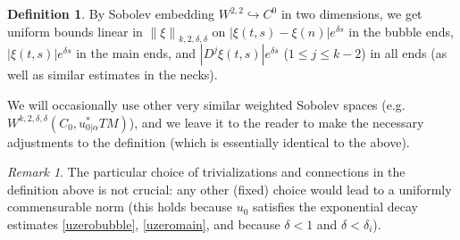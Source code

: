 \documentclass[12pt]{article}
\theoremstyle{definition}
\newtheorem{definition}[theorem]{Definition}
\theoremstyle{remark}
\newtheorem{remark}[theorem]{Remark}
\numberwithin{equation}{subsection}
\begin{document}
\begin{definition}
By Sobolev embedding $W^{2,2}\hookrightarrow C^0$ in two dimensions, we get uniform bounds linear in $\left\|\xi\right\|_{k,2,\delta,\delta}$ on $\left|\xi(t,s)-\xi(n)\right|e^{\delta s}$ in the bubble ends, $\left|\xi(t,s)\right|e^{\delta s}$ in the main ends, and $\left|D^j\xi(t,s)\right|e^{\delta s}$ ($1\leq j\leq k-2$) in all ends (as well as similar estimates in the necks).

We will occasionally use other very similar weighted Sobolev spaces (e.g.\ $W^{k,2,\delta,\delta}(C_0,u_{0|\alpha}^\ast TM)$), and we leave it to the reader to make the necessary adjustments to the definition (which is essentially identical to the above).
\end{definition}

\begin{remark}
The particular choice of trivializations and connections in the definition above is not crucial: any other (fixed) choice would lead to a uniformly commensurable norm (this holds because $u_0$ satisfies the exponential decay estimates \eqref{uzerobubble}, \eqref{uzeromain}, and because $\delta<1$ and $\delta<\delta_i$).
\end{remark}
\end{document}
